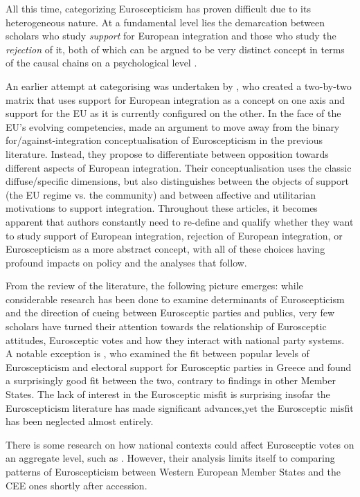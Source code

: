 All this time, categorizing Euroscepticism has proven difficult due to its heterogeneous nature. At a fundamental level lies the demarcation between scholars who study \textit{support} for European integration and those who study the \textit{rejection} of it, both of which can be argued to be very distinct concept in terms of the causal chains on a psychological level \cite{Boomgaarden2011}.

An earlier attempt at categorising was undertaken by , who created a two-by-two matrix that uses support for European integration as a concept on one axis and support for the EU as it is currently configured on the other. In the face of the EU’s evolving competencies,  made an argument to move away from the binary for/against-integration conceptualisation of Euroscepticism in the previous literature. Instead, they propose to differentiate between opposition towards different aspects of European integration. Their conceptualisation uses the classic diffuse/specific dimensions, but also distinguishes between the objects of support (the EU regime vs. the community) and between affective and utilitarian motivations to support integration. Throughout these articles, it becomes apparent that authors constantly need to re-define and qualify whether they want to study support of European integration, rejection of European integration, or Euroscepticism as a more abstract concept, with all of these choices having profound impacts on policy and the analyses that follow. 

From the review of the literature, the following picture emerges: while considerable research has been done to examine determinants of Euroscepticism and the direction of cueing between Eurosceptic parties and publics, very few scholars have turned their attention towards the relationship of Eurosceptic attitudes, Eurosceptic votes and how they interact with national party systems. A notable exception is , who examined the fit between popular levels of Euroscepticism and electoral support for Eurosceptic parties in Greece and found a surprisingly good fit between the two, contrary to findings in other Member States. The lack of interest in the Eurosceptic misfit is surprising insofar the Euroscepticism literature has made significant advances,yet the Eurosceptic misfit has been neglected almost entirely.

There is some research on how national contexts could affect Eurosceptic votes on an aggregate level, such as . However, their analysis limits itself to comparing patterns of Euroscepticism between Western European Member States and the CEE ones shortly after accession. 

